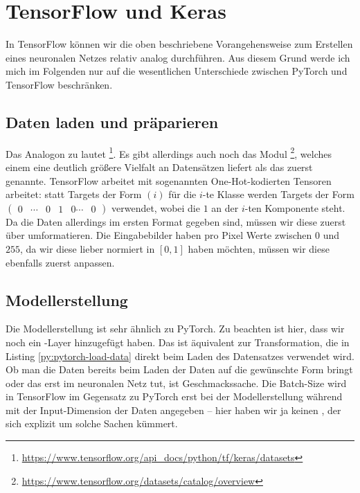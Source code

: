 

\section{TensorFlow und Keras}

In TensorFlow können wir die oben beschriebene Vorangehensweise zum Erstellen eines neuronalen Netzes 
relativ analog durchführen. Aus diesem Grund werde ich mich im Folgenden nur auf die wesentlichen 
Unterschiede zwischen PyTorch und TensorFlow beschränken. 

\subsection{Daten laden und präparieren}


Das Analogon zu  lautet 
\footnote{\url{https://www.tensorflow.org/api_docs/python/tf/keras/datasets}}. 
Es gibt allerdings auch noch das Modul \footnote{\url{https://www.tensorflow.org/datasets/catalog/overview}}, 
welches einem eine deutlich größere Vielfalt an Datensätzen liefert als das zuerst genannte.
TensorFlow arbeitet mit sogenannten One-Hot-kodierten Tensoren arbeitet: statt Targets der Form 
\((i)\) für die \(i\)-te Klasse werden Targets der Form \(\begin{pmatrix}
    0 & \cdots & 0 & 1 & 0 \cdots & 0
\end{pmatrix}\) verwendet, wobei die \(1\) an der \(i\)-ten Komponente steht. 
Da die Daten allerdings im ersten Format gegeben sind, müssen wir diese zuerst über  umformatieren. 
Die Eingabebilder haben pro Pixel Werte zwischen \(0\) und \(255\), da wir diese lieber 
normiert in \([0,1]\) haben möchten, müssen wir diese ebenfalls zuerst anpassen. 

\subsection{Modellerstellung}


Die Modellerstellung ist sehr ähnlich zu PyTorch. Zu beachten ist hier, dass 
wir noch ein -Layer hinzugefügt haben. Das ist äquivalent zur 
 Transformation, die in Listing \ref{py:pytorch-load-data} direkt beim 
Laden des Datensatzes verwendet wird. 
Ob man die Daten bereits beim Laden der Daten auf die gewünschte Form bringt oder das 
erst im neuronalen Netz tut, ist Geschmackssache. 
Die Batch-Size wird in TensorFlow im Gegensatz zu PyTorch erst bei der Modellerstellung 
während  mit der Input-Dimension der Daten angegeben -- hier haben wir ja 
keinen , der sich explizit um solche Sachen kümmert.

